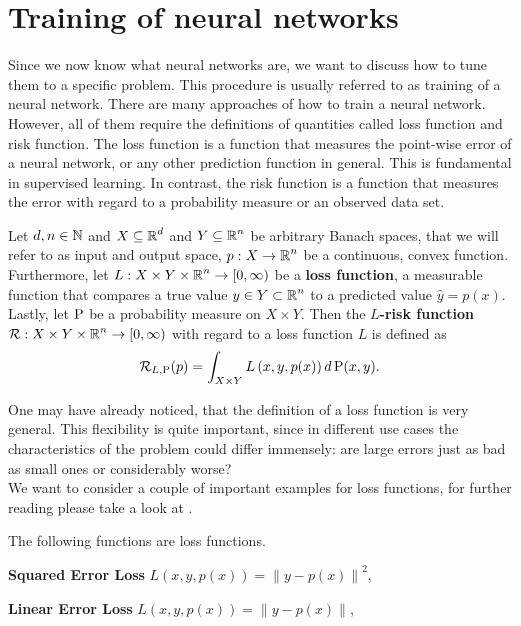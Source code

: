 \section{Training of neural networks}

Since we now know what neural networks are, we want to discuss how to tune them to a specific problem. This procedure is usually referred to as training of a neural network. There are many approaches of how to train a neural network. However, all of them require the definitions of quantities called loss function and risk function. The loss function is a function that measures the point-wise error of a neural network, or any other prediction function in general. This is fundamental in supervised learning. In contrast, the risk function is a function that measures the error with regard to a probability measure or an observed data set.


\begin{definition}\label{def_loss_risk}
Let $d, n \in \operatorname{\mathbb{N}}$ and $X\subseteq \operatorname{\mathbb{R}}^d$ and $Y \subseteq \operatorname{\mathbb{R}}^n$ be arbitrary Banach spaces, that we will refer to as input and output space, $p:X \to \operatorname{\mathbb{R}}^n$ be a continuous, convex function.\\
Furthermore, let $L: X \times Y \times \operatorname{\mathbb{R}}^n \to [0, \infty)$ be a \textbf{loss function}, a measurable function that compares a true value $y \in Y \subset \operatorname{\mathbb{R}}^n$ to a predicted value $\hat{y} = p(x)$.\\
Lastly, let $\operatorname{\text{P}}$ be a probability measure on $X \times Y$. Then the \textbf{$L$-risk function} $\operatorname{\mathcal{R}}: X \times Y \times \operatorname{\mathbb{R}}^n \to [0, \infty)$ with regard to a loss function $L$ is defined as
\begin{align*}
\operatorname{\mathcal{R}}_{L, \operatorname{\text{P}}}(p) = \int_{X\times Y} L\left(x, y, p(x) \right) d \operatorname{\text{P}}(x, y).
\end{align*}
\end{definition}

One may have already noticed, that the definition of a loss function is very general. This flexibility is quite important, since in different use cases the characteristics of the problem could differ immensely: are large errors just as bad as small ones or considerably worse?\\
We want to consider a couple of important examples for loss functions, for further reading please take a look at \cite[chapter~4.3]{goodfellow2016deep}.


\begin{example}
The following functions are loss functions.
\begin{mydescription}{}
\item[\textbf{Squared Error Loss}] $L(x, y, p(x)) = \left\|y - p(x)\right\|^2$,
\item[\textbf{Linear Error Loss}]  $L(x, y, p(x)) = \left\|y - p(x)\right\|$,
\end{mydescription}
\end{example}



